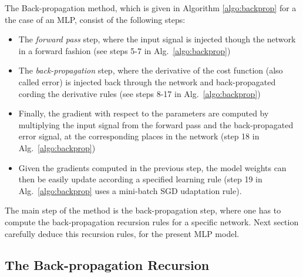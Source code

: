 The Back-propagation method, which is given in Algorithm \ref{algo:backprop} for a the case of an MLP, consist of the following steps:
\begin{itemize}
\item The \textit{forward pass} step, where the input signal is injected though the network  in a forward fashion (see steps 5-7 in Alg.~\ref{algo:backprop})
\item The \textit{back-propagation} step, where the derivative of the cost function (also called error) is injected back through the network and back-propagated cording the derivative rules (see steps 8-17 in Alg.~\ref{algo:backprop})
\item Finally, the gradient with respect to the parameters are computed by multiplying the input signal from the forward pass and the back-propagated error signal, at the corresponding places in the network (step 18 in Alg.~\ref{algo:backprop})
\item Given the gradients computed in the previous step, the model weights can then be easily update according a specified learning rule (step 19 in Alg.~\ref{algo:backprop} uses a mini-batch SGD udaptation rule).
\end{itemize}
The main step of the method is the back-propagation step, where one has to compute the back-propagation recursion rules for a specific network.
Next section carefully deduce this recursion rules, for the present MLP model. 


%

\subsection{The Back-propagation Recursion}

